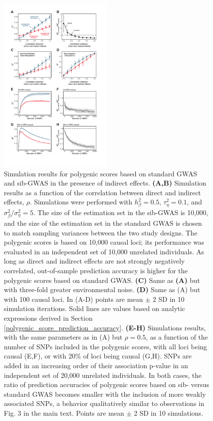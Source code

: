 \documentclass[hidelinks, 12pt]{article}
\begin{document}
\pagebreak

\begin{figure}[h]
\centering
\includegraphics[width=0.5\textwidth]{supp_figures/indirect.pdf}
\caption[Simulation results for polygenic scores based on standard GWAS and sib-GWAS in the presence of indirect effects.]{\small Simulation results for polygenic scores based on standard GWAS and sib-GWAS in the presence of indirect effects. {\bf (A,B)} Simulation results as a function of the correlation between direct and indirect effects, $\rho$. Simulations were performed with $h_{\beta}^2=0.5$, $\tau_{\eta}^2=0.1$, and ${\sigma_{\beta}^2}/{\sigma_{\eta}^2}=5$. The size of the estimation set in the sib-GWAS is 10,000, and the size of the estimation set in the standard GWAS is chosen to match sampling variances between the two study designs. The polygenic scores is based on 10,000 causal loci; its performance was evaluated in an independent set of 10,000 unrelated individuals. As long as direct and indirect effects are not strongly negatively correlated, out-of-sample prediction accuracy is higher for the polygenic scores based on standard GWAS. {\bf (C)} Same as {\bf (A)} but with three-fold greater environmental noise. {\bf (D)} Same as (A) but with 100 causal loci. In (A-D) points are mean $\pm$ 2 SD in 10 simulation iterations. Solid lines are values based on analytic expressions derived in {Section \ref{polygenic_score_prediction_accuracy}}. {\bf (E-H)} Simulations results, with the same parameters as in (A) but $\rho=0.5$, as a function of the number of SNPs included in the polygenic scores, with all loci being causal (E,F), or with 20\% of loci being causal (G,H). SNPs are added in an increasing order of their association p-value in an independent set of 20,000 unrelated individuals. In both cases, the ratio of prediction accuracies of polygenic scores based on sib- versus standard GWAS becomes smaller with the inclusion of more weakly associated SNPs, a behavior qualitatively similar to observations in Fig. 3 in the main text. Points are mean $\pm$ 2 SD in 10 simulations.} 
\label{fig_R_vs_rho_sims}
\end{figure}
\end{document}
